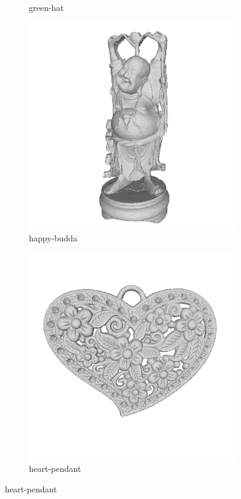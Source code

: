 \begin{figure}
\begin{subfigure}[b]{0.23\linewidth}
		\caption{green-hat}
	\end{subfigure}
	\begin{subfigure}[b]{0.23\linewidth}
		\includegraphics[width=\linewidth]{./Figures/train-dataset/22.happy-buddha.png}
		\caption{happy-budda}
	\end{subfigure}
	\begin{subfigure}[b]{0.23\linewidth}
		\includegraphics[width=\linewidth]{./Figures/train-dataset/23.heart-pendant.png}
		\caption{heart-pendant}
	\end{subfigure}
	

\end{figure}
